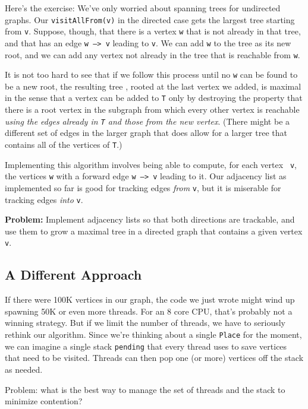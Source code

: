 Here's the exercise:  We've only worried about spanning trees for
undirected graphs.  Our {\tt visitAllFrom(v)} in the directed case gets the
largest tree starting from {\tt v}.  Suppose, though, that there is a vertex
{\tt w} that is not already in that tree, and that has an edge {\tt w --> v} 
leading to {\tt v}.  We can add {\tt w} to the tree as its new root, and we can
add any vertex not already in the tree that is reachable from {\tt w}.

It is not too hard to see that if we follow
this process until no {\tt w} can be found to be a new root, the resulting
tree {\tt }, rooted at the last vertex we added, is maximal in the sense that a
vertex can be added to {\tt T} only by destroying the property that there is a
root vertex in the subgraph from which every other vertex is reachable
{\em using the edges already in {\tt T} and those from the new vertex}.  (There
might be a different set of edges in the larger graph that does allow for a
larger tree that contains all of the vertices of {\tt T}.)

Implementing this algorithm involves being able to compute, for each vertex {\tt
v}, the vertices {\tt w} with a forward edge {\tt w --> v} leading to it.  Our
adjacency list as implemented so far is good for tracking edges {\em from}
{\tt v}, but it is miserable for tracking edges {\em into} {\tt v}. 

{\bf Problem:} Implement adjacency lists so that both directions are trackable,
and use them to grow a maximal tree in a directed graph that contains a given
vertex {\tt v}.

\subsection{A Different Approach}

If there were 100K vertices in our graph, the code we just
wrote might wind up spawning 50K or even more threads.  For an 8 core CPU,
that's probably not a winning strategy.  But if we limit the number of threads,
we have to seriously rethink our algorithm.  Since we're thinking about a
single {\tt Place} for the moment, we can imagine a single stack {\tt pending}
that every thread uses to save vertices that need to be visited.  Threads can
then pop one (or more) vertices off the stack as needed.

Problem: what is the best way to manage the set of threads and the stack to
minimize contention?

